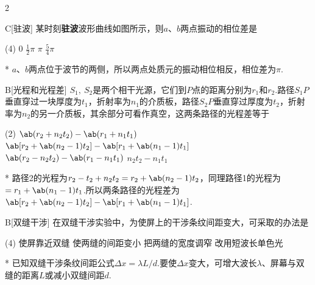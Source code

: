\begin{paracol}{2}
    \begin{choice}{C}[驻波]
        某时刻\textbf{驻波}波形曲线如图所示，则$a$、$b$两点振动的相位差是
        \begin{tasks}(4)
            \task $0$
            \task $\frac{1}{2}\pi$
            \task $\pi$
            \task $\frac{5}{4}\pi$
        \end{tasks}
    \end{choice}
\begin{solution}*
    $a$、$b$两点位于波节的两侧，所以两点处质元的振动相位相反，相位差为$\pi$.
\end{solution}
\switchcolumn\centering
\vfill
{}
\vfill
\end{paracol}

\begin{choice}{B}[光程和光程差]
    $S_1,\ S_2$是两个相干光源，它们到$P$点的距离分别为$r_1$和$r_2$.路径$S_1P$垂直穿过一块厚度为$t_1$，折射率为$n_1$的介质板，路径$S_2P$垂直穿过厚度为$t_2$，折射率为$n_2$的另一介质板，其余部分可看作真空，这两条路径的光程差等于
    \begin{tasks}(2)
        \task $\ab(r_2+n_2t_2)-\ab(r_1+n_1t_1)$
        \task $\ab[r_2+\ab(n_2-1)t_2]-\ab[r_1+\ab(n_1-1)t_1]$
        \task $\ab(r_2-n_2t_2)-\ab(r_1-n_1t_1)$
        \task $n_2t_2-n_1t_1$
    \end{tasks}
\end{choice}
\begin{solution}*
    路径2的光程为$r_2-t_2+n_2t_2=r_2+\ab(n_2-1)t_2$，同理路径1的光程为$=r_1+\ab(n_1-1)t_1$.所以两条路径的光程差为$\ab[r_2+\ab(n_2-1)t_2]-\ab[r_1+\ab(n_1-1)t_1]$.
\end{solution}

\begin{choice}{B}[双缝干涉]
    在双缝干涉实验中，为使屏上的干涉条纹间距变大，可采取的办法是
    \begin{tasks}(4)
        \task 使屏靠近双缝
        \task 使两缝的间距变小
        \task 把两缝的宽度调窄
        \task 改用短波长单色光
    \end{tasks}
\end{choice}
\begin{solution}*
    已知双缝干涉条纹间距公式$\Delta x=\lambda L/d$.要使$\Delta x$变大，可增大波长$\lambda$、屏幕与双缝的距离$L$或减小双缝间距$d$.
\end{solution}


